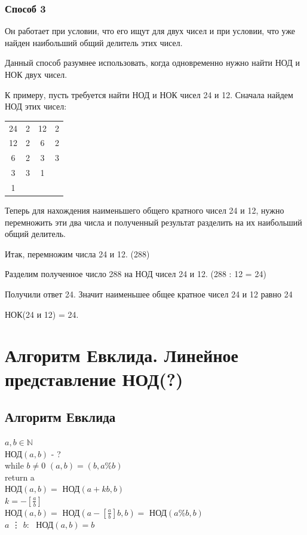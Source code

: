 \documentclass[12pt]{article}
\begin{document}
\subsubsection{Способ 3}
Он работает при условии, что его ищут для двух чисел и при условии, что уже найден наибольший общий делитель этих чисел.\par
Данный способ разумнее использовать, когда одновременно нужно найти НОД и НОК двух чисел.\par
К примеру, пусть требуется найти НОД и НОК чисел 24 и 12. Сначала найдем НОД этих чисел:\par
\begin{tabular}{c|cc|c}
    24 & 2 & 12 & 2 \\
    12 & 2 & 6  & 2 \\
    6  & 2 & 3  & 3 \\
    3  & 3 & 1  &   \\
    1  &   &
\end{tabular}\par
Теперь для нахождения наименьшего общего кратного чисел 24 и 12, нужно перемножить эти два числа и полученный результат разделить на их наибольший общий делитель.\par
Итак, перемножим числа 24 и 12. (288)\par
Разделим полученное число 288 на НОД чисел 24 и 12. (288 : 12 = 24)\par
Получили ответ 24. Значит наименьшее общее кратное чисел 24 и 12 равно 24\par
НОК(24 и 12) = 24.\par

\setcounter{section}{1}
\section{Алгоритм Евклида. Линейное представление НОД(?)}

\subsection{Алгоритм Евклида}
\noindent $a, b \in \mathbb{N}$ \\
НОД$(a, b)$ - ? \\
while $b \ne 0$
$(a, b) = (b, a \% b)$\\
return a\\
НОД$(a, b) = $ НОД$(a + kb, b)$\\
$k = -[\frac{a}{b}]$\\
НОД$(a, b) = $ НОД$(a -[\frac{a}{b}]b, b) =$ НОД$(a \% b, b)$\\
$a $ \vdots $ $ $b: $ $ $ НОД$(a, b) = b$
\end{document}
